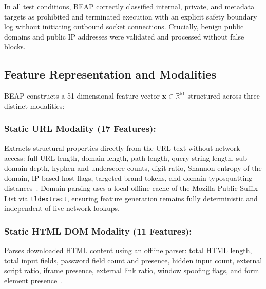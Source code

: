 \documentclass[conference]{IEEEtran}
\begin{document}
In all test conditions, BEAP correctly classified internal, private, and metadata targets as prohibited and terminated execution with an explicit safety boundary log without initiating outbound socket connections. Crucially, benign public domains and public IP addresses were validated and processed without false blocks.

\subsection{Feature Representation and Modalities}\label{feature-engineering}

BEAP constructs a 51-dimensional feature vector $\mathbf{x} \in \mathbb{R}^{51}$ structured across three distinct modalities:

\subsubsection{Static URL Modality (17 Features):} Extracts structural properties directly from the URL text without network access: full URL length, domain length, path length, query string length, sub-domain depth, hyphen and underscore counts, digit ratio, Shannon entropy of the domain, IP-based host flags, targeted brand tokens, and domain typosquatting distances~\cite{bu2021,kara2022}. Domain parsing uses a local offline cache of the Mozilla Public Suffix List via \texttt{tldextract}, ensuring feature generation remains fully deterministic and independent of live network lookups.

\subsubsection{Static HTML DOM Modality (11 Features):} Parses downloaded HTML content using an offline parser: total HTML length, total input fields, password field count and presence, hidden input count, external script ratio, iframe presence, external link ratio, window spoofing flags, and form element presence~\cite{anupam2021,kalabarige2022}.
\end{document}
